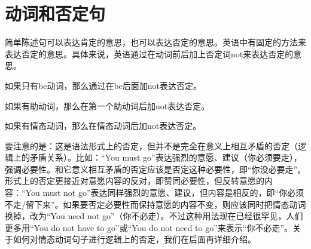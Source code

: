 \documentclass[10.5pt, a4paper]{ctexbook} %
\begin{document}
\section{动词和否定句}

简单陈述句可以表达肯定的意思，也可以表达否定的意思。英语中有固定的方法来表达否定的意思。具体来说，英语通过在动词前后加上否定词not来表达否定的意思。

如果只有be动词，那么通过在be后面加not表达否定。

\begin{liju}
\end{liju}

如果有助动词，那么在第一个助动词后加not表达否定。

\begin{liju}
\end{liju}

如果有情态动词，那么在情态动词后加not表达否定。

\begin{liju}
\end{liju}

要注意的是：这是语法形式上的否定，但并不是完全在意义上相互矛盾的否定（逻辑上的矛盾关系）。比如：“You must go”表达强烈的意愿、建议（你必须要走），强调必要性。和它意义相互矛盾的否定应该是否定这种必要性，即“你没必要走”。形式上的否定更接近对意愿内容的反对，即赞同必要性，但反转意愿的内容：“You must not go”表达同样强烈的意愿、建议，但内容是相反的，即“你必须不走/留下来”。如果要否定必要性而保持意愿的内容不变，则应该同时把情态动词换掉，改为“You need not go”（你不必走）。不过这种用法现在已经很罕见，人们更多用“You do not have to go”或“You do not need to go”来表示“你不必走”。关于如何对情态动词句子进行逻辑上的否定，我们在后面再详细介绍。
\end{document}
